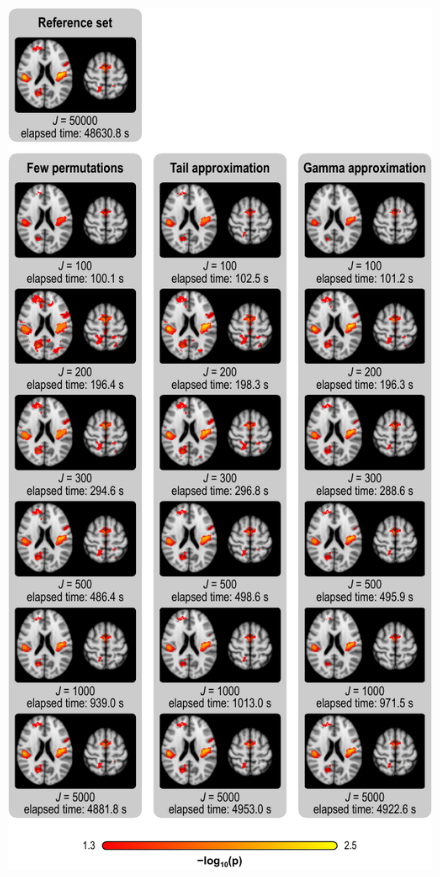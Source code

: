 \begin{figure}[!tp]
\centering
\includegraphics[scale=.9]{figures/vbm-tfce-fwep.pdf}
\label{fig:vbm-tfce-fwep_noref}
\end{figure}

